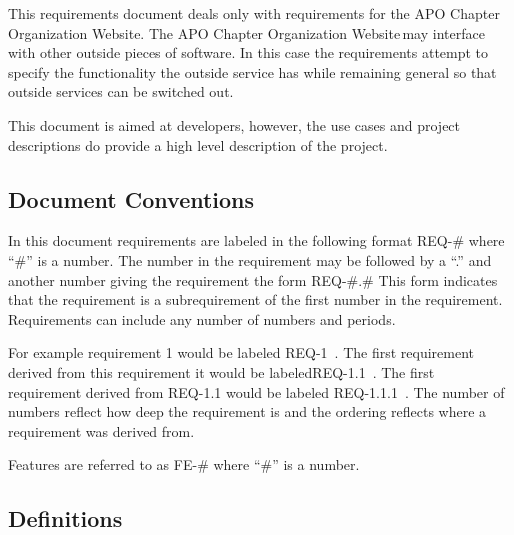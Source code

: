 \documentclass{article}
\newcommand{\projName}{APO Chapter Organization Website}
\newcommand{\req}[1]{REQ-{#1}}
\begin{document}
This requirements document deals only with requirements for the \projName. The \projName \,may interface with
other outside pieces of software. In this case the requirements attempt to specify the functionality the outside service has
while remaining general so that outside services can be switched out.

This document is aimed at developers, however, the use cases and project descriptions do provide a high level
description of the project.

\subsection{Document Conventions}

In this document requirements are labeled in the following
format REQ-\#  where ``\#'' is a number.
The number in the requirement may be followed by a ``.'' and 
another number giving the requirement the form
REQ-\#.\#  This form indicates that the requirement is a
subrequirement of the first number in the requirement. 
Requirements can include any number of numbers and periods.

For example requirement 1 would be labeled \req{1} \,. The first
requirement derived from this requirement it would be labeled\req{1.1}
\,. The first requirement derived from \req{1.1} would be labeled
\req{1.1.1} \,. The number of numbers reflect how deep the requirement
is and the ordering reflects where a requirement was derived from.

Features are referred to as FE-\# where ``\#'' is a number.

\subsection{Definitions}
\end{document}
